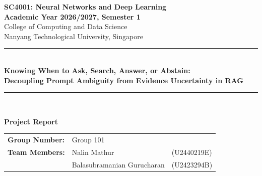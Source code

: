 \documentclass[10pt,a4paper]{article}
\begin{document}
\begin{titlepage}
    \centering
    \vspace*{1.0cm}
    
    {\Large \textbf{SC4001: Neural Networks and Deep Learning}}\\[0.3cm]
    {\large \textbf{Academic Year 2026/2027, Semester 1}}\\[0.2cm]
    {\large College of Computing and Data Science}\\[0.2cm]
    {\large Nanyang Technological University, Singapore}\\[2.0cm]
    
    \rule{\linewidth}{1.2pt}\\[0.5cm]
    {\LARGE \textbf{Knowing When to Ask, Search, Answer, or Abstain:\\
    Decoupling Prompt Ambiguity from Evidence Uncertainty in RAG}}\\[0.3cm]
    \rule{\linewidth}{1.2pt}\\[1.0cm]
    
    \begin{minipage}{0.85\textwidth}
        \centering
        \textbf{\large Project Report}\\[0.8cm]
        \begin{tabular}{lll}
            \textbf{Group Number:} & \multicolumn{2}{l}{Group 101} \\[0.25cm]
            \textbf{Team Members:} & Nalin Mathur & (U2440219E) \\[0.15cm]
                                   & Balasubramanian Gurucharan & (U2423294B) \\[0.8cm]
        \end{tabular}
    \end{minipage}
    
    \vfill
    \vspace*{0.8cm}
\end{titlepage}

\tableofcontents
\newpage









\newpage


\end{document}

